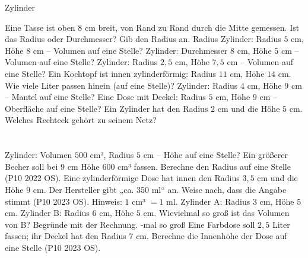 \begin{aufgabe}{Zylinder}
\begin{teile}
\teil Eine Tasse ist oben $8$ cm breit, von Rand zu Rand durch die Mitte gemessen. Ist das Radius oder Durchmesser? Gib den Radius an. Radius \leerfeld[cm]
\teil Zylinder: Radius $5$ cm, Höhe $8$ cm – Volumen auf eine Stelle? \leerfeld[cm³]
\teil Zylinder: Durchmesser $8$ cm, Höhe $5$ cm – Volumen auf eine Stelle? \leerfeld[cm³]
\teil Zylinder: Radius $2{,}5$ cm, Höhe $7{,}5$ cm – Volumen auf eine Stelle? \leerfeld[cm³]
\teil Ein Kochtopf ist innen zylinderförmig: Radius $11$ cm, Höhe $14$ cm. Wie viele Liter passen hinein (auf eine Stelle)? \leerfeld[l]
\teil Zylinder: Radius $4$ cm, Höhe $9$ cm – Mantel auf eine Stelle? \leerfeld[cm²]
\teil Eine Dose mit Deckel: Radius $5$ cm, Höhe $9$ cm – Oberfläche auf eine Stelle? \leerfeld[cm²]
\teil Ein Zylinder hat den Radius $2$ cm und die Höhe $5$ cm. Welches Rechteck gehört zu seinem Netz? \\  \\  \\ 
\teil Zylinder: Volumen $500$ cm³, Radius $5$ cm – Höhe auf eine Stelle? \leerfeld[cm]
\teil Ein größerer Becher soll bei $9$ cm Höhe $600$ cm³ fassen. Berechne den Radius auf eine Stelle \hfill (P10 2022 OS). \leerfeld[cm]
\teil Eine zylinderförmige Dose hat innen den Radius $3{,}5$ cm und die Höhe $9$ cm. Der Hersteller gibt „ca. 350 ml“ an. Weise nach, dass die Angabe stimmt \hfill (P10 2023 OS). Hinweis: $1$ cm³ $= 1$ ml.
\teil Zylinder A: Radius $3$ cm, Höhe $5$ cm. Zylinder B: Radius $6$ cm, Höhe $5$ cm. Wievielmal so groß ist das Volumen von B? Begründe mit der Rechnung. \leerfeld -mal so groß
\teil Eine Farbdose soll $2{,}5$ Liter fassen; ihr Deckel hat den Radius $7$ cm. Berechne die Innenhöhe der Dose auf eine Stelle \hfill (P10 2023 OS). \leerfeld[cm]
\end{teile}
\end{aufgabe}

